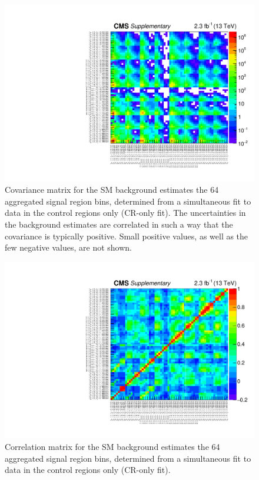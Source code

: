 \clearpage
\begin{figure}[!h]
  \begin{center}
    \includegraphics[width=\textwidth]{Supplementary/aggregated_covariance_aux.pdf} 
    \caption{Covariance matrix for the SM background estimates
      the 64 aggregated signal region bins, determined from a
      simultaneous fit to data in the control regions only (CR-only
      fit). The uncertainties in the background estimates are
      correlated in such a way that the covariance is typically
      positive. Small positive values, as well as the few negative
      values, are not shown. 
      \label{fig:aggr_corr} 
    }
  \end{center}
\end{figure}

\clearpage
\begin{figure}[!h]
  \begin{center}
    \includegraphics[width=\textwidth]{Supplementary/aggregated_correlation_aux.pdf} 
    \caption{Correlation matrix for the SM background estimates
      the 64 aggregated signal region bins, determined from a
      simultaneous fit to data in the control regions only (CR-only
      fit).
      \label{fig:aggr_corr} 
    }
  \end{center}
\end{figure}

